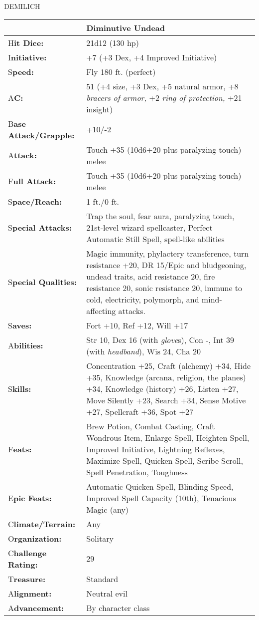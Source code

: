 \documentclass{article}
\begin{document}
\vspace{12pt}
{\LARGE{}DEMILICH }

\begin{tabular}{|>{\raggedright}p{64pt}|>{\raggedright}p{262pt}|}
\hline
  & Diminutive Undead \tabularnewline
\hline
H\textbf{it Dice:} & 21d12 (130 hp) \tabularnewline
\hline
I\textbf{nitiative:} &  +7 (+3 Dex, +4 Improved Initiative) \tabularnewline
\hline
S\textbf{peed:} &  Fly 180 ft. (perfect) \tabularnewline
\hline
A\textbf{C:} &  51 (+4 size, +3 Dex, +5 natural armor, +8 \textit{bracers of armor, 
}+2 \textit{ring of protection, }+21 insight) \tabularnewline
\hline
B\textbf{ase Attack/Grapple:} &  +10/-2\tabularnewline
\hline
A\textbf{ttack:} &  Touch +35 (10d6+20 plus paralyzing touch) melee\tabularnewline
\hline
F\textbf{ull Attack:} &  Touch +35 (10d6+20 plus paralyzing touch) melee\tabularnewline
\hline
S\textbf{pace/Reach:} &  1 ft./0 ft. \tabularnewline
\hline
S\textbf{pecial Attacks:} &  Trap the soul, fear aura, paralyzing touch, 21st-level 
wizard spellcaster, Perfect Automatic Still Spell, spell-like abilities \tabularnewline
\hline
S\textbf{pecial Qualities:} &  Magic immunity, phylactery transference, turn resistance 
+20, DR 15/Epic and bludgeoning, undead traits, acid resistance 20, fire resistance 
20, sonic resistance 20, immune to cold, electricity, polymorph, and mind-affecting 
attacks. \tabularnewline
\hline
S\textbf{aves:} &  Fort +10, Ref +12, Will +17 \tabularnewline
\hline
A\textbf{bilities:} &  Str 10, Dex 16 (with \textit{glove}s), Con -, Int 39 (with 
\textit{headband}), Wis 24, Cha 20 \tabularnewline
\hline
S\textbf{kills:} & Concentration +25, Craft (alchemy) +34, Hide +35, Knowledge 
(arcana, religion, the planes) +34, Knowledge (history) +26, Listen +27, Move Silently 
+23, Search +34, Sense Motive +27, Spellcraft +36, Spot +27\tabularnewline
\hline
F\textbf{eats:} &  Brew Potion, Combat Casting, Craft Wondrous Item, Enlarge Spell, 
Heighten Spell, Improved Initiative, Lightning Reflexes, Maximize Spell, Quicken 
Spell, Scribe Scroll, Spell Penetration, Toughness \tabularnewline
\hline
E\textbf{pic Feats:} &  Automatic Quicken Spell, Blinding Speed, Improved Spell 
Capacity (10th), Tenacious Magic (any) \tabularnewline
\hline
C\textbf{limate/Terrain:} &  Any \tabularnewline
\hline
O\textbf{rganization:} &  Solitary \tabularnewline
\hline
C\textbf{hallenge Rating:} &  29 \tabularnewline
\hline
T\textbf{reasure:} &  Standard \tabularnewline
\hline
A\textbf{lignment:} &  Neutral evil \tabularnewline
\hline
A\textbf{dvancement:} &  By character class \tabularnewline
\hline
\end{tabular}
\end{document}
